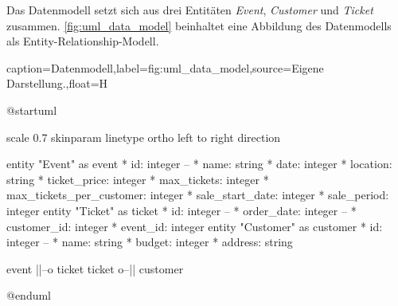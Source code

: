 Das Datenmodell setzt sich aus drei Entitäten \textit{Event}, \textit{Customer} und \textit{Ticket} zusammen.
\autoref{fig:uml_data_model} beinhaltet eine Abbildung des Datenmodells als Entity-Relationship-Modell.

\begin{dhbwfigure}{caption=Datenmodell,label=fig:uml_data_model,source={Eigene Darstellung.},float=H}
    \begin{plantuml}
        @startuml

        scale 0.7
        skinparam linetype ortho
        left to right direction

        entity "Event" as event {
            * id: integer
            --
            * name: string
            * date: integer
            * location: string
            * ticket_price: integer
            * max_tickets: integer
            * max_tickets_per_customer: integer
            * sale_start_date: integer
            * sale_period: integer
        }   
        entity "Ticket" as ticket {
            * id: integer
            --
            * order_date: integer
            --
            * customer_id: integer
            * event_id: integer
        }
        entity "Customer" as customer {
            * id: integer
            --
            * name: string
            * budget: integer
            * address: string
        }

        event ||--o{ ticket
        ticket }o--|| customer

        @enduml
    \end{plantuml}
\end{dhbwfigure}\unskip


